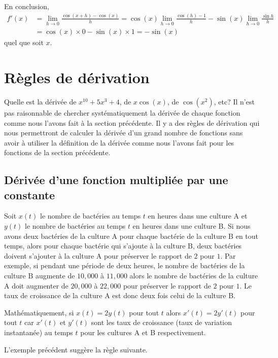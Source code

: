 {En conclusion,
\begin{align*}
f'(x) &= \lim_{h\rightarrow 0} \frac{\cos(x+h)-\cos(x)}{h} =
\cos(x) \lim_{h\rightarrow 0}  \frac{\cos(h)-1}{h} 
- \sin(x) \lim_{h\rightarrow 0} \frac{\sin{h}}{h} \\
&= \cos(x) \times 0 - \sin(x) \times 1 = -\sin(x)
\end{align*}
quel que soit $x$.

\section{Règles de dérivation}

Quelle est la dérivée de $x^{10}+5x^3+4$, de $x \cos(x)$, de
$\cos(x^2)$, etc?  Il n'est pas raisonnable de chercher
systématiquement la dérivée de chaque fonction comme nous l'avons fait à la
section précédente.  Il y a des règles de dérivation qui nous
permettront de calculer la dérivée d'un grand nombre de fonctions sans
avoir à utiliser la définition de la dérivée comme nous l'avons fait
pour les fonctions de la section précédente.

\subsection{Dérivée d'une fonction multipliée par une constante}

\begin{egg}
Soit $x(t)$ le nombre de bactéries au temps $t$ en heures dans une
culture A et $y(t)$ le nombre de bactéries au temps $t$ en heures dans
une culture B.  Si nous avons deux bactéries de la culture A pour chaque
bactérie de la culture B en tout temps, alors pour chaque bactérie
qui s'ajoute à la culture B, deux bactéries doivent s'ajouter à la
culture A pour préserver le rapport de $2$ pour $1$.  Par exemple, si
pendant une période de deux heures, le nombre de bactéries de la
culture B augmente de $10,000$ à $11,000$ alors le nombre de bactéries
de la culture A doit augmenter de $20,000$ à $22,000$ pour préserver
le rapport de $2$ pour $1$.  Le taux de croissance de la culture A est
donc deux fois celui de la culture B.

Mathématiquement, si $x(t) = 2 y(t)$ pour tout $t$ alors
$x'(t) = 2 y'(t)$ pour tout $t$ car $x'(t)$ et $y'(t)$ sont les taux
de croissance (taux de variation instantanée) au temps $t$ pour les
cultures A et B respectivement.
\end{egg}

L'exemple précédent suggère la règle suivante.

}
